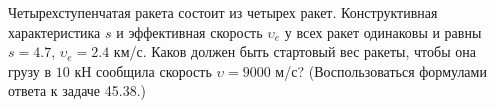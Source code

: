 Четырехступенчатая ракета состоит из четырех ракет.
Конструктивная характеристика $s$ и эффективная скорость $\upsilon _e$
у всех ракет одинаковы и равны $s = 4.7$, $\upsilon _e = 2.4$ км/с.
Каков должен быть стартовый вес ракеты, чтобы она грузу в $10$ кН
сообщила скорость $\upsilon = 9000$ м/с?
(Воспользоваться формулами ответа к задаче 45.38.)
